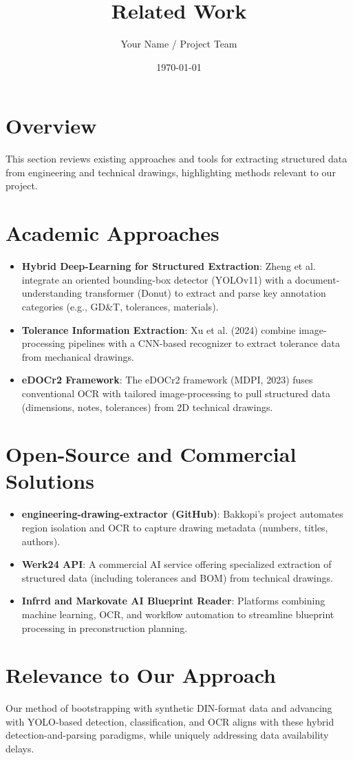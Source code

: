 \documentclass[a4paper,12pt]{article}
\title{Related Work}
\author{Your Name / Project Team}
\date{\today}
\begin{document}
\maketitle

\section*{Overview}
This section reviews existing approaches and tools for extracting structured data from engineering
and technical drawings, highlighting methods relevant to our project.

\section*{Academic Approaches}
\begin{itemize}[left=0pt]
\item \textbf{Hybrid Deep-Learning for Structured Extraction}: Zheng et al. integrate an oriented
bounding-box detector (YOLOv11) with a document-understanding transformer (Donut) to
extract and parse key annotation categories (e.g., GD&T, tolerances, materials).
\item \textbf{Tolerance Information Extraction}: Xu et al. (2024) combine image-processing pipelines
with a CNN-based recognizer to extract tolerance data from mechanical drawings.
\item \textbf{eDOCr2 Framework}: The eDOCr2 framework (MDPI, 2023) fuses conventional OCR with
tailored image-processing to pull structured data (dimensions, notes, tolerances) from 2D
technical drawings.
\end{itemize}

\section*{Open-Source and Commercial Solutions}
\begin{itemize}[left=0pt]
\item \textbf{engineering-drawing-extractor (GitHub)}: Bakkopi’s project automates region isolation
and OCR to capture drawing metadata (numbers, titles, authors).
\item \textbf{Werk24 API}: A commercial AI service offering specialized extraction of structured
data (including tolerances and BOM) from technical drawings.
\item \textbf{Infrrd and Markovate AI Blueprint Reader}: Platforms combining machine learning,
OCR, and workflow automation to streamline blueprint processing in preconstruction planning.
\end{itemize}

\section*{Relevance to Our Approach}
Our method of bootstrapping with synthetic DIN-format data and advancing with YOLO-based detection,
classification, and OCR aligns with these hybrid detection-and-parsing paradigms, while uniquely
addressing data availability delays.
\end{document}
